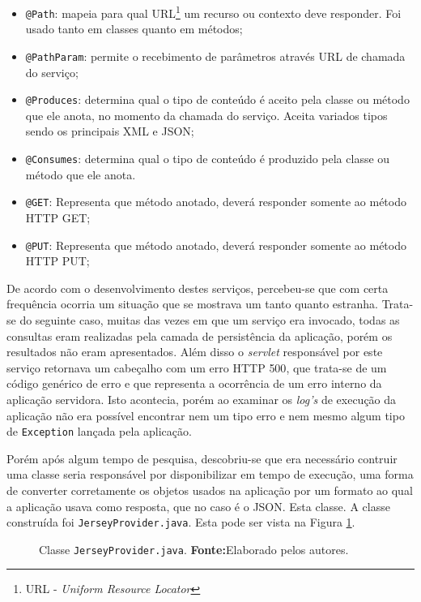	\begin{itemize}
	  \item \texttt{@Path}: mapeia para qual URL\footnote{URL - \textit{Uniform
	  Resource Locator}} um recurso ou contexto deve responder. Foi usado tanto em
	  classes quanto em métodos;
	  \item \texttt{@PathParam}: permite o recebimento de parâmetros através URL de
	  chamada do serviço;
	  \item \texttt{@Produces}: determina qual o tipo de conteúdo é aceito pela
	  classe ou método que ele anota, no momento da chamada do serviço. Aceita
	  variados tipos sendo os principais XML e JSON;
	  \item \texttt{@Consumes}: determina qual o tipo de conteúdo é produzido pela
	  classe ou método que ele anota. 
	  \item \texttt{@GET}: Representa que método anotado, deverá responder somente
	  ao método HTTP GET;
	  \item \texttt{@PUT}: Representa que método anotado, deverá responder somente
	  ao método HTTP PUT;
	\end{itemize}
	
	\par De acordo com o desenvolvimento destes serviços, percebeu-se que com certa
frequência ocorria um situação que se mostrava um tanto quanto estranha.
Trata-se do seguinte caso, muitas das vezes em que um serviço era invocado,
todas as consultas eram realizadas pela camada de persistência da aplicação,
porém os resultados não eram apresentados. Além disso o \textit{servlet}
responsável por este serviço retornava um cabeçalho com um erro HTTP {500}, que
trata-se de um código genérico de erro e que representa a ocorrência de um erro
interno da aplicação servidora. Isto acontecia, porém ao examinar os
\textit{log's} de execução da aplicação não era possível  encontrar nem um tipo
erro e nem mesmo algum tipo de \texttt{Exception} lançada pela aplicação. 
	
	\par Porém após algum tempo de pesquisa, descobriu-se que era necessário
contruir uma classe seria responsável por disponibilizar em tempo de execução,
uma forma de converter corretamente os objetos  usados na aplicação por um
formato ao qual a aplicação usava como resposta, que no caso é o JSON. Esta
classe. A classe construída foi \texttt{JerseyProvider.java}. Esta pode ser
vista na Figura \ref{fig:desws27_1}.

	\begin{figure}[h!]
		
		\caption[Classe JerseyProvider.java]{Classe \texttt{JerseyProvider.java}.
		\textbf{Fonte:}Elaborado pelos autores.}
		\label{fig:desws27_1}
	\end{figure}
	
